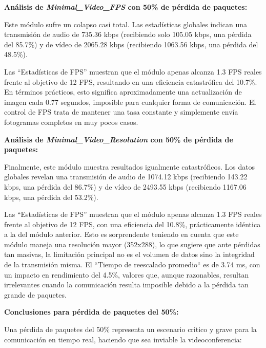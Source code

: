 \vspace{\baselineskip}

\textbf{Análisis de \textit{Minimal\_Video\_FPS} con 50\% de pérdida de paquetes:}
\vspace{\baselineskip}

Este módulo sufre un colapso casi total. Las estadísticas globales indican una transmisión de audio de 735.36 kbps (recibiendo solo 105.05 kbps, una pérdida del 85.7\%) y de vídeo de 2065.28 kbps (recibiendo 1063.56 kbps, una pérdida del 48.5\%).

Las ``Estadísticas de FPS'' muestran que el módulo apenas alcanza 1.3 FPS reales frente al objetivo de 12 FPS, resultando en una eficiencia catastrófica del 10.7\%. En términos prácticos, esto significa aproximadamente una actualización de imagen cada 0.77 segundos, imposible para cualquier forma de comunicación. El control de FPS trata de mantener una tasa constante y simplemente envía fotogramas completos en muy pocos casos.

\vspace{\baselineskip}

\textbf{Análisis de \textit{Minimal\_Video\_Resolution} con 50\% de pérdida de paquetes:}
\vspace{\baselineskip}

Finalmente, este módulo muestra resultados igualmente catastróficos. Los datos globales revelan una transmisión de audio de 1074.12 kbps (recibiendo 143.22 kbps, una pérdida del 86.7\%) y de vídeo de 2493.55 kbps (recibiendo 1167.06 kbps, una pérdida del 53.2\%).
\vspace{\baselineskip}

Las ``Estadísticas de FPS'' muestran que el módulo apenas alcanza 1.3 FPS reales frente al objetivo de 12 FPS, con una eficiencia del 10.8\%, prácticamente idéntica a la del módulo anterior. Esto es sorprendente teniendo en cuenta que este módulo maneja una resolución mayor (352x288), lo que sugiere que ante pérdidas tan masivas, la limitación principal no es el volumen de datos sino la integridad de la transmisión misma. El ``Tiempo de reescalado promedio`` es de 3.74 ms, con un impacto en rendimiento del 4.5\%, valores que, aunque razonables, resultan irrelevantes cuando la comunicación resulta imposible debido a la pérdida tan grande de paquetes.
\vspace{\baselineskip}

\textbf{Conclusiones para pérdida de paquetes del 50\%:}

Una pérdida de paquetes del 50\% representa un escenario critico y grave para la comunicación en tiempo real, haciendo que sea inviable la videoconferencia:
\vspace{\baselineskip}


